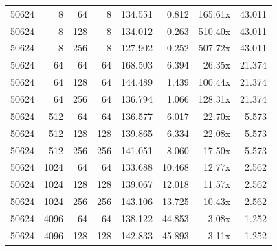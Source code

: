 {\begin{longtable}{rrrrrrrr}
50624 & 8 & 64 & 8 & 134.551 & 0.812 & 165.61x & 43.011\\
50624 & 8 & 128 & 8 & 134.012 & 0.263 & 510.40x & 43.011\\
50624 & 8 & 256 & 8 & 127.902 & 0.252 & 507.72x & 43.011\\
50624 & 64 & 64 & 64 & 168.503 & 6.394 & 26.35x & 21.374\\
50624 & 64 & 128 & 64 & 144.489 & 1.439 & 100.44x & 21.374\\
50624 & 64 & 256 & 64 & 136.794 & 1.066 & 128.31x & 21.374\\
50624 & 512 & 64 & 64 & 136.577 & 6.017 & 22.70x & 5.573\\
50624 & 512 & 128 & 128 & 139.865 & 6.334 & 22.08x & 5.573\\
50624 & 512 & 256 & 256 & 141.051 & 8.060 & 17.50x & 5.573\\
50624 & 1024 & 64 & 64 & 133.688 & 10.468 & 12.77x & 2.562\\
50624 & 1024 & 128 & 128 & 139.067 & 12.018 & 11.57x & 2.562\\
50624 & 1024 & 256 & 256 & 143.106 & 13.725 & 10.43x & 2.562\\
50624 & 4096 & 64 & 64 & 138.122 & 44.853 & 3.08x & 1.252\\
50624 & 4096 & 128 & 128 & 142.833 & 45.893 & 3.11x & 1.252\\
\end{longtable}
}


